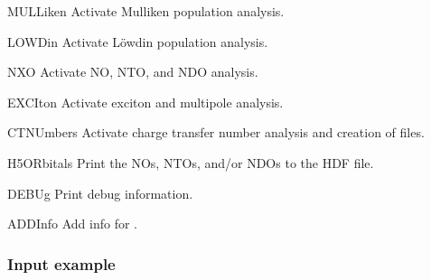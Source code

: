\begin{keywordlist}
\item[MULLiken]
Activate Mulliken population analysis.

\item[LOWDin]
Activate L\"owdin population analysis.

\item[NXO]
Activate NO, NTO, and NDO analysis.

\item[EXCIton]
Activate exciton and multipole analysis.

\item[CTNUmbers]
Activate charge transfer number analysis and creation of  files.

\item[H5ORbitals]
Print the NOs, NTOs, and/or NDOs to the HDF file.

\item[DEBUg]
Print debug information.

\item[ADDInfo]
Add info for .
\end{keywordlist}

\subsubsection{Input example}

